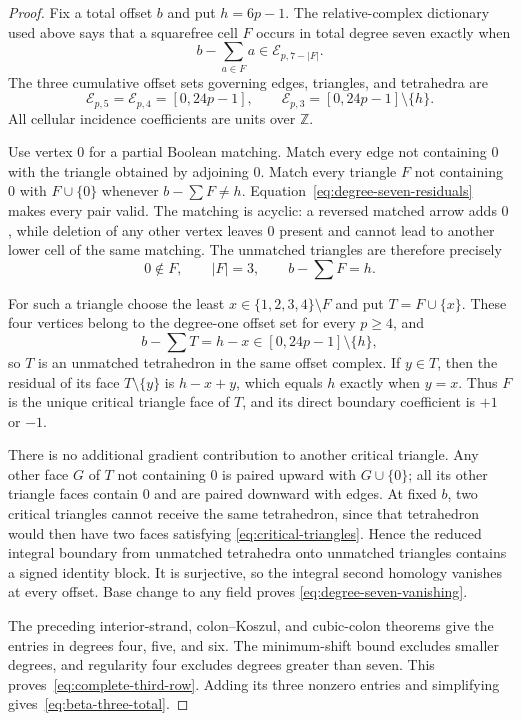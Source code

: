 \documentclass[11pt]{article}
\theoremstyle{definition}
\theoremstyle{remark}
\begin{document}
\begin{proof}
Fix a total offset $b$ and put $h=6p-1$. The relative-complex dictionary used above says that a
squarefree cell $F$ occurs in total degree seven exactly when
\[
b-\sum_{a\in F}a\in\mathcal E_{p,7-|F|}.
\]
The three cumulative offset sets governing edges, triangles, and tetrahedra are
\begin{equation}
\mathcal E_{p,5}=\mathcal E_{p,4}=[0,24p-1],\qquad
\mathcal E_{p,3}=[0,24p-1]\setminus\{h\}.\label{eq:degree-seven-residuals}
\end{equation}
All cellular incidence coefficients are units over $\mathbb Z$.

Use vertex $0$ for a partial Boolean matching. Match every edge not containing $0$ with the
triangle obtained by adjoining $0$. Match every triangle $F$ not containing $0$ with
$F\cup\{0\}$ whenever $b-\sum F\ne h$. Equation~\eqref{eq:degree-seven-residuals} makes every
pair valid. The matching is acyclic: a reversed matched arrow adds $0$, while deletion of any
other vertex leaves $0$ present and cannot lead to another lower cell of the same matching.
The unmatched triangles are therefore precisely
\begin{equation}
0\notin F,\qquad |F|=3,\qquad b-\sum F=h.\label{eq:critical-triangles}
\end{equation}

For such a triangle choose the least $x\in\{1,2,3,4\}\setminus F$ and put
$T=F\cup\{x\}$. These four vertices belong to the degree-one offset set for every $p\ge4$, and
\[
b-\sum T=h-x\in[0,24p-1]\setminus\{h\},
\]
so $T$ is an unmatched tetrahedron in the same offset complex. If $y\in T$, then the residual of
its face $T\setminus\{y\}$ is $h-x+y$, which equals $h$ exactly when $y=x$. Thus $F$ is the
unique critical triangle face of $T$, and its direct boundary coefficient is $+1$ or $-1$.

There is no additional gradient contribution to another critical triangle. Any other face $G$ of
$T$ not containing $0$ is paired upward with $G\cup\{0\}$; all its other triangle faces contain
$0$ and are paired downward with edges. At fixed $b$, two critical triangles cannot receive the
same tetrahedron, since that tetrahedron would then have two faces satisfying
\eqref{eq:critical-triangles}. Hence the reduced integral boundary from unmatched tetrahedra onto
unmatched triangles contains a signed identity block. It is surjective, so the integral second
homology vanishes at every offset. Base change to any field proves
\eqref{eq:degree-seven-vanishing}.

The preceding interior-strand, colon--Koszul, and cubic-colon theorems give the entries in degrees
four, five, and six. The minimum-shift bound excludes smaller degrees, and regularity four excludes
degrees greater than seven. This proves~\eqref{eq:complete-third-row}. Adding its three nonzero
entries and simplifying gives~\eqref{eq:beta-three-total}.
\end{proof}
\end{document}
